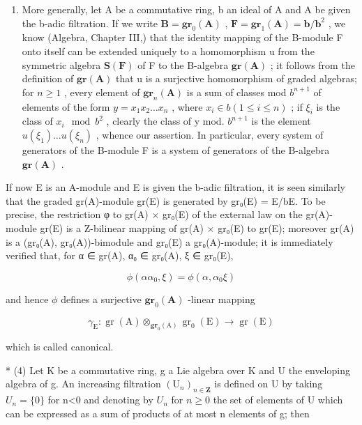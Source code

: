 \begin{enumerate}
\item
  More generally, let A be a commutative ring, b an ideal of A and A be given the b-adic filtration. If we write \(\mathbf{B} = \mathbf{gr}_{0}(\mathbf{A})\) , \(\mathbf{F} = \mathbf{gr}_{1}(\mathbf{A}) = \mathbf{b}/\mathbf{b}^{2}\) , we know (Algebra, Chapter III,) that the identity mapping of the B-module F onto itself can be extended uniquely to a homomorphism u from the symmetric algebra \(\mathbf{S}(\mathbf{F})\) of F to the B-algebra \(\mathbf{gr}(\mathbf{A})\) ; it follows from the definition of \(\mathbf{gr}(\mathbf{A})\) that u is a surjective homomorphism of graded algebras; for \(n \geqslant 1\) , every element of \(\mathbf{gr}_{n}(\mathbf{A})\) is a sum of classes mod \(b^{n+1}\) of elements of the form \(y = x_{1}x_{2}\ldots x_{n}\) , where \(x_{i} \in b (1 \leqslant i \leqslant n)\) ; if \(\xi_{i}\) is the class of \(x_{i} \mod b^{2}\) , clearly the class of y mod. \(b^{n+1}\) is the element \(u(\xi_{1})\ldots u(\xi_{n})\) , whence our assertion. In particular, every system of generators of the B-module F is a system of generators of the B-algebra \(\mathbf{gr}(\mathbf{A})\) .
\end{enumerate}

If now E is an A-module and E is given the b-adic filtration, it is seen similarly that the graded gr(A)-module gr(E) is generated by gr₀(E) = E/bE. To be precise, the restriction φ to gr(A) × gr₀(E) of the external law on the gr(A)-module gr(E) is a Z-bilinear mapping of gr(A) × gr₀(E) to gr(E); moreover gr(A) is a (gr₀(A), gr₀(A))-bimodule and gr₀(E) a gr₀(A)-module; it is immediately verified that, for α ∈ gr(A), α₀ ∈ gr₀(A), ξ ∈ gr₀(E),

\[
\phi (\alpha \alpha_ {0}, \xi) = \phi (\alpha , \alpha_ {0} \xi)
\]

and hence \(\phi\) defines a surjective \(\mathbf{gr}_0(\mathbf{A})\) -linear mapping

\[
\gamma_ {\mathrm{E}} \colon \operatorname{gr} (\mathrm{A}) \otimes_ {\mathbf {g r} _ {0} (\mathrm{A})} \operatorname{gr} _ {0} (\mathrm{E}) \rightarrow \operatorname{gr} (\mathrm{E})\tag{11}
\]

which is called canonical.

* (4) Let K be a commutative ring, g a Lie algebra over K and U the enveloping algebra of g. An increasing filtration \((\mathrm{U}_{n})_{n\in\mathbf{Z}}\) is defined on U by taking \(U_{n}=\{0\}\) for n\textless0 and denoting by \(U_{n}\) for \(n\geqslant0\) the set of elements of U which can be expressed as a sum of products of at most n elements of g; then

